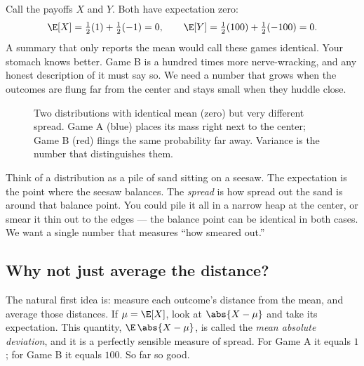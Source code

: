 Call the payoffs $X$ and $Y$. Both have expectation zero:
\[
  \E[X] = \tfrac12(1) + \tfrac12(-1) = 0,
  \qquad
  \E[Y] = \tfrac12(100) + \tfrac12(-100) = 0.
\]
A summary that only reports the mean would call these games identical. Your
stomach knows better. Game B is a hundred times more nerve-wracking, and any
honest description of it must say so. We need a number that grows when the
outcomes are flung far from the center and stays small when they huddle
close.

\begin{figure}[H]
\centering
{}
\caption{Two distributions with identical mean (zero) but very different
spread. Game A (blue) places its mass right next to the center; Game B (red)
flings the same probability far away. Variance is the number that
distinguishes them.}
\label{ch09:fig-twogames}
\end{figure}

\begin{intuitionbox}
Think of a distribution as a pile of sand sitting on a seesaw. The
expectation is the point where the seesaw balances. The \emph{spread} is how
spread out the sand is around that balance point. You could pile it all in a
narrow heap at the center, or smear it thin out to the edges --- the balance
point can be identical in both cases. We want a single number that measures
``how smeared out.''
\end{intuitionbox}

\subsection{Why not just average the distance?}

The natural first idea is: measure each outcome's distance from the mean, and
average those distances. If $\mu = \E[X]$, look at $\abs{X - \mu}$ and take
its expectation. This quantity, $\E\,\abs{X-\mu}$, is called the \emph{mean
absolute deviation}, and it is a perfectly sensible measure of spread. For
Game A it equals $1$; for Game B it equals $100$. So far so good.

